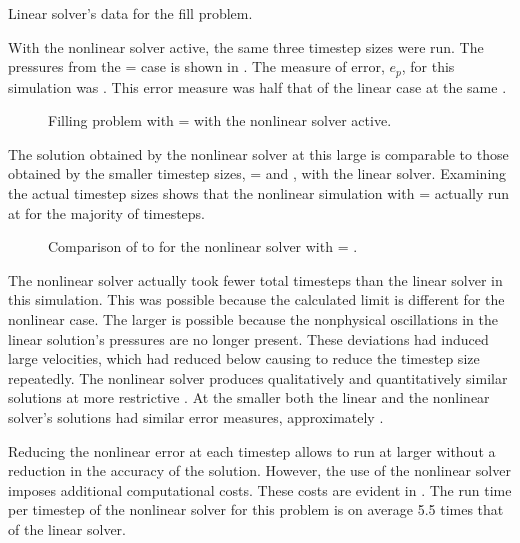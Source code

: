 \begin{table}[h!tb]
\centering
\singlespace

\caption{Linear solver's data for the fill problem.}
\label{tab:vmpLinRunTime}
\end{table}

With the nonlinear solver active, the same three timestep sizes were run.
The pressures from the \dtmax{} =  case is shown in .
The measure of error, $e_{p}$, for this simulation was .
This error measure was half that of the linear case at the same \dtmax{}.

\begin{figure}[h!tb]
\centering

\caption{Filling problem with \dtmax{} =  with the nonlinear solver active.}
\label{fig:nlnFill1em1}
\end{figure}

The solution obtained by the nonlinear solver at this large \dtmax{} is comparable to those obtained by the smaller timestep sizes, \dtmax{} =  and , with the linear solver.
Examining the actual timestep sizes shows that the nonlinear simulation with \dtmax{} =  actually run at \dtmax{} for the majority of timesteps.

\begin{figure}[h!tb]
\centering

\caption{Comparison of \dt{} to \dtcrnt{} for the nonlinear solver with \dtmax{} = .}
\label{fig:vmpDeltaTNln1em1}
\end{figure}

The nonlinear solver actually took fewer total timesteps than the linear solver in this simulation.
This was possible because the calculated \dtcrnt{} limit is different for the nonlinear case.
The larger \dtcrnt{} is possible because the nonphysical oscillations in the linear solution's pressures are no longer present.
These deviations had induced large velocities, which had reduced \dtcrnt{} below \dtmax{} causing \cobra{} to reduce the timestep size repeatedly.
The nonlinear solver produces qualitatively and quantitatively similar solutions at more restrictive \dtmax{}.
At the smaller \dtmax{} both the linear and the nonlinear solver's solutions had similar error measures, approximately .

Reducing the nonlinear error at each timestep allows \cobra{} to run at larger \dt{} without a reduction in the accuracy of the solution.
However, the use of the nonlinear solver imposes additional computational costs.
These costs are evident in .
The run time per timestep of the nonlinear solver for this problem is on average 5.5 times that of the linear solver.

